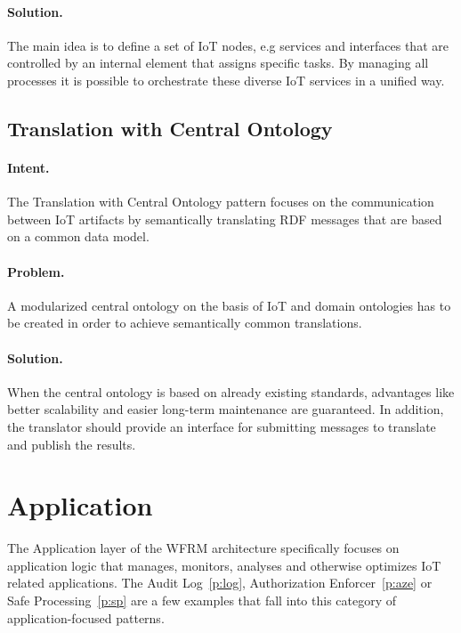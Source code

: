 \paragraph{\textbf{Solution.}} The main idea is to define a set of IoT nodes, e.g services and interfaces that are controlled by an internal element that assigns specific tasks. By managing all processes it is possible to orchestrate these diverse IoT services in a unified way.


\subsection{Translation with Central Ontology~\cite{Tkaczyk2018}}
\label{p:ontology} 

\paragraph{\textbf{Intent.}} The Translation with Central Ontology pattern focuses on the communication between IoT artifacts by semantically translating RDF messages that are based on a common data model. 

\paragraph{\textbf{Problem.}} A modularized central ontology on the basis of IoT and domain ontologies has to be created in order to achieve semantically common translations.

\paragraph{\textbf{Solution.}} When the central ontology is based on already existing standards, advantages like better scalability and easier long-term maintenance are guaranteed. In addition, the translator should provide an interface for submitting messages to translate and publish the results.



\section{Application}\label{L6}
The Application layer of the WFRM architecture specifically focuses on application logic that manages, monitors, analyses and otherwise optimizes IoT related applications. The Audit Log~\ref{p:log}, Authorization Enforcer~\ref{p:aze} or Safe Processing~\ref{p:sp} are a few examples that fall into this category of application-focused patterns.


